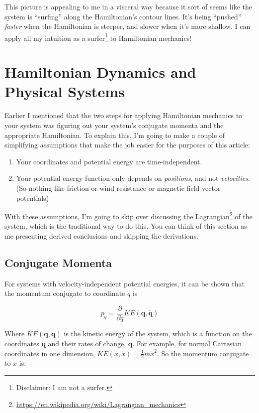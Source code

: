 \documentclass[]{article}
\renewcommand{\href}[2]{#2\footnote{\url{#1}}}
\begin{document}
This picture is appealing to me in a visceral way because it sort of seems like
the system is ``surfing'' along the Hamiltonian's contour lines. It's being
``pushed'' \emph{faster} when the Hamiltonian is steeper, and slower when it's
more shallow. I can apply all my intuition as a surfer\footnote{Disclaimer: I am
  not a surfer.} to Hamiltonian mechanics!

\section{Hamiltonian Dynamics and Physical
Systems}\label{hamiltonian-dynamics-and-physical-systems}

Earlier I mentioned that the two steps for applying Hamiltonian mechanics to
your system was figuring out your system's conjugate momenta and the appropriate
Hamiltonian. To explain this, I'm going to make a couple of simplifying
assumptions that make the job easier for the purposes of this article:

\begin{enumerate}
\def\labelenumi{\arabic{enumi}.}
\tightlist
\item
  Your coordinates and potential energy are time-independent.
\item
  Your potential energy function only depends on \emph{positions}, and not
  \emph{velocities}. (So nothing like friction or wind resistance or magnetic
  field vector potentials)
\end{enumerate}

With these assumptions, I'm going to skip over discussing the
\href{https://en.wikipedia.org/wiki/Lagrangian_mechanics}{Lagrangian} of the
system, which is the traditional way to do this. You can think of this section
as me presenting derived conclusions and skipping the derivations.

\subsection{Conjugate Momenta}\label{conjugate-momenta}

For systems with velocity-independent potential energies, it can be shown that
the momentum conjugate to coordinate \(q\) is

\[
p_q = \frac{\partial}{\partial \dot{q}} KE(\mathbf{q}, \dot{\mathbf{q}})
\]

Where \(KE(\mathbf{q},\dot{\mathbf{q}})\) is the kinetic energy of the system,
which is a function on the coordinates \(\mathbf{q}\) and their rates of change,
\(\dot{\mathbf{q}}\). For example, for normal Cartesian coordinates in one
dimension, \(KE(x, \dot{x}) = \frac{1}{2} m \dot{x}^2\). So the momentum
conjugate to \(x\) is:
\end{document}
